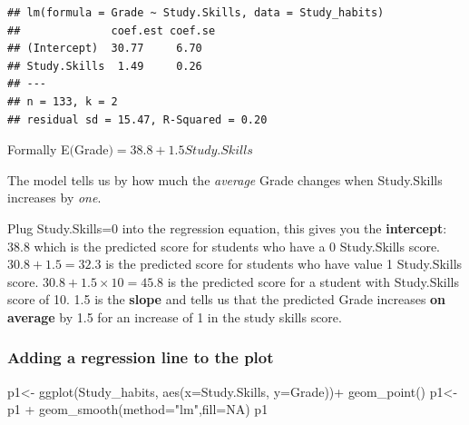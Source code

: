 \documentclass[
]{gitbook}
\newenvironment{Shaded}{\begin{snugshade}}{\end{snugshade}}
\newcommand{\AttributeTok}[1]{\textcolor[rgb]{0.77,0.63,0.00}{#1}}
\newcommand{\ConstantTok}[1]{\textcolor[rgb]{0.00,0.00,0.00}{#1}}
\newcommand{\FunctionTok}[1]{\textcolor[rgb]{0.00,0.00,0.00}{#1}}
\newcommand{\NormalTok}[1]{#1}
\newcommand{\OtherTok}[1]{\textcolor[rgb]{0.56,0.35,0.01}{#1}}
\newcommand{\SpecialCharTok}[1]{\textcolor[rgb]{0.00,0.00,0.00}{#1}}
\newcommand{\StringTok}[1]{\textcolor[rgb]{0.31,0.60,0.02}{#1}}
\begin{document}
\begin{verbatim}
## lm(formula = Grade ~ Study.Skills, data = Study_habits)
##              coef.est coef.se
## (Intercept)  30.77     6.70  
## Study.Skills  1.49     0.26  
## ---
## n = 133, k = 2
## residual sd = 15.47, R-Squared = 0.20
\end{verbatim}

Formally E\((\)Grade\()=38.8+1.5Study.Skills\)

The model tells us by how much the \emph{average} Grade changes when Study.Skills increases by \emph{one}.

Plug Study.Skills=0 into the regression equation, this gives you the \textbf{intercept}: 38.8 which is the predicted score for students who have a 0 Study.Skills score. \(30.8+1.5=32.3\) is the predicted score for students who have value 1 Study.Skills score. \(30.8+1.5\times10=45.8\) is the predicted score for a student with Study.Skills score of 10.
1.5 is the \textbf{slope} and tells us that the predicted Grade increases \textbf{on average} by 1.5 for an increase of 1 in the study skills score.


\hypertarget{adding-a-regression-line-to-the-plot}{%
\subsubsection{Adding a regression line to the plot}\label{adding-a-regression-line-to-the-plot}}

\begin{Shaded}
\begin{Highlighting}[]
\NormalTok{p1}\OtherTok{\textless{}{-}} \FunctionTok{ggplot}\NormalTok{(Study\_habits, }\FunctionTok{aes}\NormalTok{(}\AttributeTok{x=}\NormalTok{Study.Skills, }\AttributeTok{y=}\NormalTok{Grade))}\SpecialCharTok{+} \FunctionTok{geom\_point}\NormalTok{() }
\NormalTok{p1}\OtherTok{\textless{}{-}}\NormalTok{ p1 }\SpecialCharTok{+} \FunctionTok{geom\_smooth}\NormalTok{(}\AttributeTok{method=}\StringTok{"lm"}\NormalTok{,}\AttributeTok{fill=}\ConstantTok{NA}\NormalTok{)}
\NormalTok{p1}
\end{Highlighting}
\end{Shaded}
\end{document}
